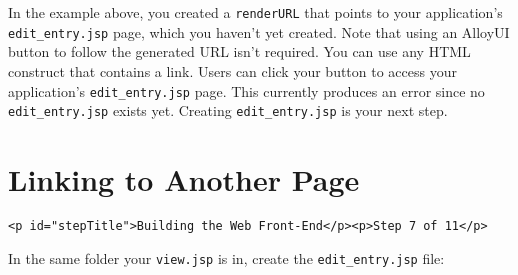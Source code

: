 In the example above, you created a \texttt{renderURL} that points to
your application's \texttt{edit\_entry.jsp} page, which you haven't yet
created. Note that using an AlloyUI button to follow the generated URL
isn't required. You can use any HTML construct that contains a link.
Users can click your button to access your application's
\texttt{edit\_entry.jsp} page. This currently produces an error since no
\texttt{edit\_entry.jsp} exists yet. Creating \texttt{edit\_entry.jsp}
is your next step.

\chapter{Linking to Another Page}\label{linking-to-another-page}

\begin{verbatim}
<p id="stepTitle">Building the Web Front-End</p><p>Step 7 of 11</p>
\end{verbatim}

In the same folder your \texttt{view.jsp} is in, create the
\texttt{edit\_entry.jsp} file:

